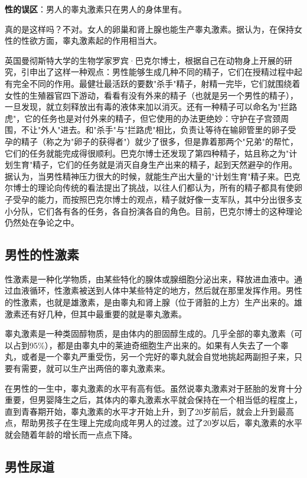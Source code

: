 \textbf{性的误区}：男人的睾丸激素只在男人的身体里有。

真的是这样吗？不对。女人的卵巢和肾上腺也能生产睾丸激素。据认为，在保持女性的性欲方面，睾丸激素起的作用相当大。

英国曼彻斯特大学的生物学家罗宾·巴克尔博士，根据自己在动物身上开展的研究，引申出了这样一种观点：男性能够生成几种不同的精子，它们在授精过程中起有完全不同的作用。最健壮最活跃的要数"杀手"精子，射精一完毕，它们就围绕着女性的生殖器官四下游动，看看有没有外来的精子（也就是另一个男性的精子），一旦发现，就立刻释放出有毒的液体来加以消灭。还有一种精子可以命名为"拦路虎"，它的任务也是对付外来的精子，但它使用的办法更绝妙：守护在子宫颈周围，不让"外人"进去。和"杀手"与"拦路虎"相比，负责让等待在输卵管里的卵子受孕的精子（称之为"卵子的获得者"）就少了很多，但是靠着那两个"兄弟"的帮忙，它们的任务就能完成得很顺利。巴克尔博士还发现了第四种精子，姑且称之为"计划生育"精子，它们的任务就是消灭自身生产出来的精子，起到天然避孕的作用。据认为，当男性精神压力很大的时候，就能生产出大量的"计划生育"精子来。巴克尔博士的理论向传统的看法提出了挑战，以往人们都认为，所有的精子都具有使卵子受孕的能力，而按照巴克尔博士的观点，精子就好像一支军队，其中分出很多支小分队，它们各有各的任务，各自扮演各自的角色。目前，巴克尔博士的这种理论仍然处在争论之中。

\subsection{男性的性激素}

性激素是一种化学物质，由某些特化的腺体或腺细胞分泌出来，释放进血液中。通过血液循环，性激素被送到人体中某些特定的地方，然后就在那里发挥作用。男性的性激素，也就是雄激素，是由睾丸和肾上腺（位于肾脏的上方）生产出来的。雄激素还有好几种，但其中最重要的就是睾丸激素。

睾丸激素是一种类固醇物质，是由体内的胆固醇生成的。几乎全部的睾丸激素（可以占到95\%），都是由睾丸中的莱迪奇细胞生产出来的。如果有人失去了一个睾丸，或者是一个睾丸严重受伤，另一个完好的睾丸就会自觉地挑起两副担子来，只要有需要，就可以生产出两倍的睾丸激素来。

在男性的一生中，睾丸激素的水平有高有低。虽然说睾丸激素对于胚胎的发育十分重要，但男婴降生之后，其体内的睾丸激素水平就会保持在一个相当低的程度上，直到青春期开始，睾丸激素的水平才开始上升，到了20岁前后，就会上升到最高点，帮助男孩子在生理上完成向成年男人的过渡。过了20岁以后，睾丸激素的水平就会随着年龄的增长而一点点下降。

\subsection{男性尿道}
